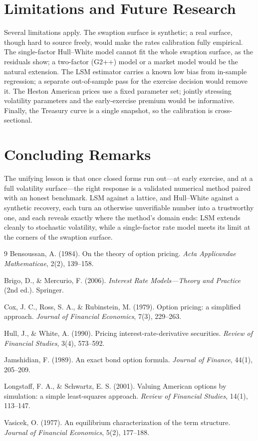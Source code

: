 \documentclass[11pt,a4paper]{report}
\begin{document}
\section{Limitations and Future Research}
Several limitations apply. The swaption surface is synthetic; a real surface, though
hard to source freely, would make the rates calibration fully empirical. The
single-factor Hull--White model cannot fit the whole swaption surface, as the
residuals show; a two-factor (G2++) model or a market model would be the natural
extension. The LSM estimator carries a known low bias from in-sample regression; a
separate out-of-sample pass for the exercise decision would remove it. The Heston
American prices use a fixed parameter set; jointly stressing volatility parameters
and the early-exercise premium would be informative. Finally, the Treasury curve is a
single snapshot, so the calibration is cross-sectional.

\section{Concluding Remarks}
The unifying lesson is that once closed forms run out---at early exercise, and at a
full volatility surface---the right response is a validated numerical method paired
with an honest benchmark. LSM against a lattice, and Hull--White against a synthetic
recovery, each turn an otherwise unverifiable number into a trustworthy one, and each
reveals exactly where the method's domain ends: LSM extends cleanly to stochastic
volatility, while a single-factor rate model meets its limit at the corners of the
swaption surface.

\begin{thebibliography}{9}
Bensoussan, A. (1984). On the theory of option pricing. \emph{Acta Applicandae
Mathematicae}, 2(2), 139--158.

Brigo, D., \& Mercurio, F. (2006). \emph{Interest Rate Models---Theory and Practice}
(2nd ed.). Springer.

Cox, J. C., Ross, S. A., \& Rubinstein, M. (1979). Option pricing: a simplified
approach. \emph{Journal of Financial Economics}, 7(3), 229--263.

Hull, J., \& White, A. (1990). Pricing interest-rate-derivative securities.
\emph{Review of Financial Studies}, 3(4), 573--592.

Jamshidian, F. (1989). An exact bond option formula. \emph{Journal of Finance},
44(1), 205--209.

Longstaff, F. A., \& Schwartz, E. S. (2001). Valuing American options by simulation:
a simple least-squares approach. \emph{Review of Financial Studies}, 14(1), 113--147.

Vasicek, O. (1977). An equilibrium characterization of the term structure.
\emph{Journal of Financial Economics}, 5(2), 177--188.
\end{thebibliography}
\end{document}
